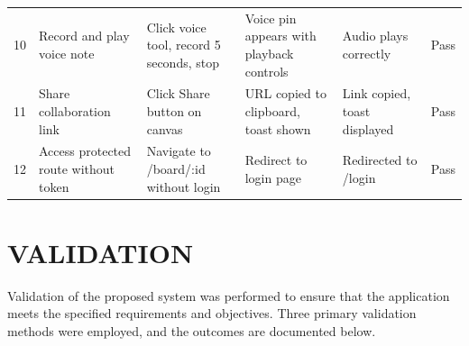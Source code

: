 \documentclass[12pt,a4paper]{report}
\begin{document}
\begin{table}[htbp]
\begin{tabular}{@{} c p{2.8cm} p{2.5cm} p{2.5cm} p{2.2cm} c @{}}
    10 & Record and play voice note & Click voice tool, record 5 seconds, stop & Voice pin appears with playback controls & Audio plays correctly & Pass \\
    11 & Share collaboration link & Click Share button on canvas & URL copied to clipboard, toast shown & Link copied, toast displayed & Pass \\
    12 & Access protected route without token & Navigate to /board/:id without login & Redirect to login page & Redirected to /login & Pass \\
    \bottomrule
  \end{tabular}
\end{table}

\section{VALIDATION}

Validation of the proposed system was performed to ensure that the application meets the specified requirements and objectives. Three primary validation methods were employed, and the outcomes are documented below.
\end{document}

